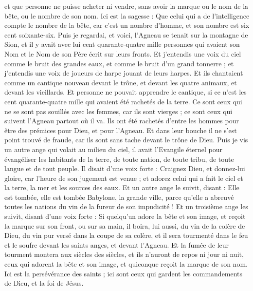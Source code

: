 \begin{multicols}{2}
et que personne ne puisse acheter ni vendre, sans avoir la marque ou le nom de la bête, ou le nombre de son nom.
Ici est la sagesse : Que celui qui a de l'intelligence compte le nombre de la bête, car c'est un nombre d'homme, et son nombre est six cent soixante-six.
\VerseOne{}Puis je regardai, et voici, l'Agneau se tenait sur la montagne de Sion, et il y avait avec lui cent quarante-quatre mille personnes qui avaient son Nom et le Nom de son Père écrit sur leurs fronts.
Et j'entendis une voix du ciel comme le bruit des grandes eaux, et comme le bruit d'un grand tonnerre ; et j'entendis une voix de joueurs de harpe jouant de leurs harpes.
Et ils chantaient comme un cantique nouveau devant le trône, et devant les quatre animaux, et devant les vieillards. Et personne ne pouvait apprendre le cantique, si ce n'est les cent quarante-quatre mille qui avaient été rachetés de la terre.
Ce sont ceux qui ne se sont pas souillés avec les femmes, car ils sont vierges ; ce sont ceux qui suivent l'Agneau partout où il va. Ils ont été rachetés d'entre les hommes pour être des prémices pour Dieu, et pour l'Agneau.
Et dans leur bouche il ne s'est point trouvé de fraude, car ils sont sans tache devant le trône de Dieu.
Puis je vis un autre ange qui volait au milieu du ciel, il avait l'Evangile éternel pour évangéliser les habitants de la terre, de toute nation, de toute tribu, de toute langue et de tout peuple.
Il disait d'une voix forte : Craignez Dieu, et donnez-lui gloire, car l'heure de son jugement est venue ; et adorez celui qui a fait le ciel et la terre, la mer et les sources des eaux.
Et un autre ange le suivit, disant : Elle est tombée, elle est tombée Babylone, la grande ville, parce qu'elle a abreuvé toutes les nations du vin de la fureur de son impudicité !
Et un troisième ange les suivit, disant d'une voix forte : Si quelqu'un adore la bête et son image, et reçoit la marque sur son front, ou sur sa main,
il boira, lui aussi, du vin de la colère de Dieu, du vin pur versé dans la coupe de sa colère, et il sera tourmenté dans le feu et le soufre devant les saints anges, et devant l'Agneau.
Et la fumée de leur tourment montera aux siècles des siècles, et ils n'auront de repos ni jour ni nuit, ceux qui adorent la bête et son image, et quiconque reçoit la marque de son nom.
Ici est la persévérance des saints ; ici sont ceux qui gardent les commandements de Dieu, et la foi de Jésus.

\end{multicols}
